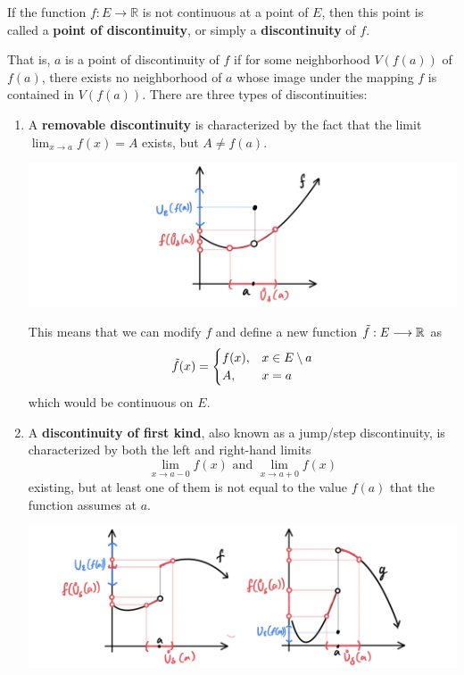   \begin{definition}[Discontinuity]
    If the function $f: E \longrightarrow \mathbb{R}$ is not continuous at a point of $E$, then this point is called a \textbf{point of discontinuity}, or simply a \textbf{discontinuity} of $f$. 

    That is, $a$ is a point of discontinuity of $f$ if for some neighborhood $V(f(a))$ of $f(a)$, there exists no neighborhood of $a$ whose image under the mapping $f$ is contained in $V(f(a))$. 
    There are three types of discontinuities: 
    \begin{enumerate}
      \item A \textbf{removable discontinuity} is characterized by the fact that the limit $\lim_{x \rightarrow a} f(x) = A$ exists, but $A \neq f(a)$. \begin{center}
          \includegraphics[scale=0.23]{img/Removable_Discontinuity.PNG}
      \end{center}
      This means that we can modify $f$ and define a new function $\Tilde{f}: E \longrightarrow \mathbb{R}$ as
      \[\Tilde{f}(x) = \begin{cases}
      f(x), & x \in E \setminus a \\
      A, & x = a
      \end{cases}\]
      which would be continuous on $E$. 
      \item A \textbf{discontinuity of first kind}, also known as a jump/step discontinuity, is characterized by both the left and right-hand limits 
      \[\lim_{x \rightarrow a-0} f(x) \text{ and } \lim_{x \rightarrow a+0} f(x)\]
      existing, but at least one of them is not equal to the value $f(a)$ that the function assumes at $a$. 
      \begin{center}
          \includegraphics[scale=0.23]{img/Discontinuity_First.PNG}

\end{center}
\end{enumerate}
\end{definition}
